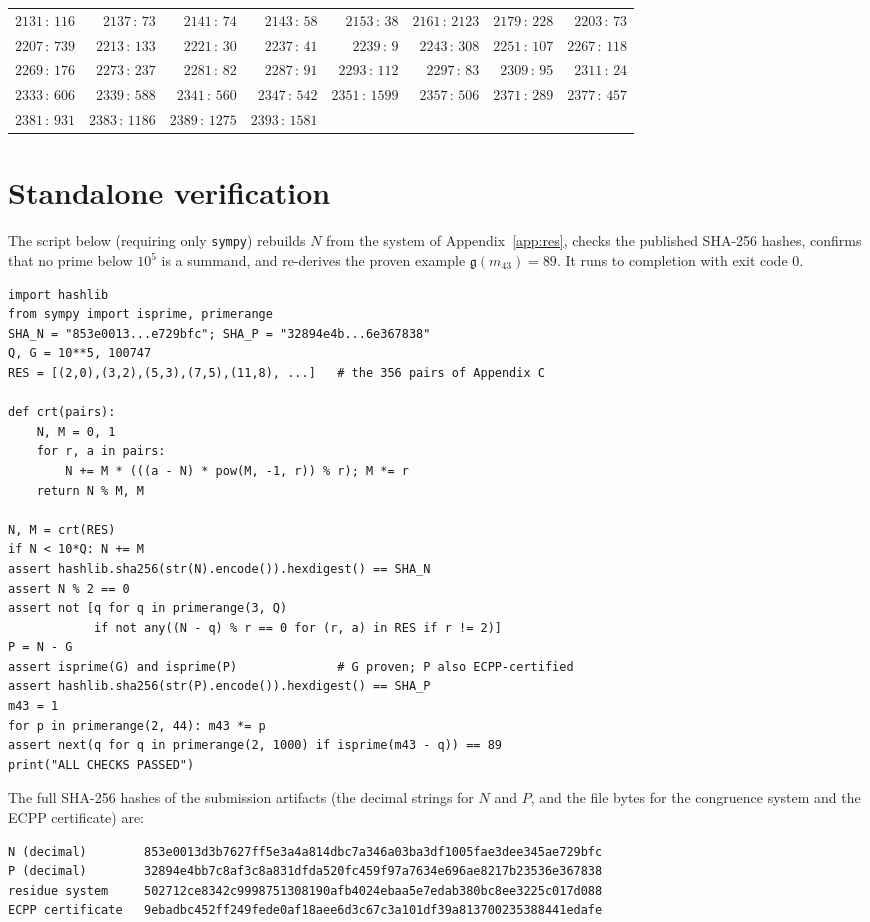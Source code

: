 \documentclass[11pt]{article}
\theoremstyle{plain}
\theoremstyle{definition}
\theoremstyle{remark}
\newcommand{\N}{N}
\newcommand{\g}{\mathfrak{g}}
\begin{document}
\begin{center}
\begin{tabular}{rrrrrrrr}
$2131\,{:}\,116$ & $2137\,{:}\,73$ & $2141\,{:}\,74$ & $2143\,{:}\,58$ & $2153\,{:}\,38$ & $2161\,{:}\,2123$ & $2179\,{:}\,228$ & $2203\,{:}\,73$ \\
$2207\,{:}\,739$ & $2213\,{:}\,133$ & $2221\,{:}\,30$ & $2237\,{:}\,41$ & $2239\,{:}\,9$ & $2243\,{:}\,308$ & $2251\,{:}\,107$ & $2267\,{:}\,118$ \\
$2269\,{:}\,176$ & $2273\,{:}\,237$ & $2281\,{:}\,82$ & $2287\,{:}\,91$ & $2293\,{:}\,112$ & $2297\,{:}\,83$ & $2309\,{:}\,95$ & $2311\,{:}\,24$ \\
$2333\,{:}\,606$ & $2339\,{:}\,588$ & $2341\,{:}\,560$ & $2347\,{:}\,542$ & $2351\,{:}\,1599$ & $2357\,{:}\,506$ & $2371\,{:}\,289$ & $2377\,{:}\,457$ \\
$2381\,{:}\,931$ & $2383\,{:}\,1186$ & $2389\,{:}\,1275$ & $2393\,{:}\,1581$ &  &  &  &  \\
\bottomrule
\end{tabular}
\end{center}

\section{Standalone verification}\label{app:verify}
The script below (requiring only \texttt{sympy}) rebuilds $\N$ from the system of
Appendix~\ref{app:res}, checks the published SHA-256 hashes, confirms that no
prime below $10^{5}$ is a summand, and re-derives the proven example
$\g(m_{43})=89$. It runs to completion with exit code $0$.
\begin{verbatim}
import hashlib
from sympy import isprime, primerange
SHA_N = "853e0013...e729bfc"; SHA_P = "32894e4b...6e367838"
Q, G = 10**5, 100747
RES = [(2,0),(3,2),(5,3),(7,5),(11,8), ...]   # the 356 pairs of Appendix C

def crt(pairs):
    N, M = 0, 1
    for r, a in pairs:
        N += M * (((a - N) * pow(M, -1, r)) % r); M *= r
    return N % M, M

N, M = crt(RES)
if N < 10*Q: N += M
assert hashlib.sha256(str(N).encode()).hexdigest() == SHA_N
assert N % 2 == 0
assert not [q for q in primerange(3, Q)
            if not any((N - q) % r == 0 for (r, a) in RES if r != 2)]
P = N - G
assert isprime(G) and isprime(P)              # G proven; P also ECPP-certified
assert hashlib.sha256(str(P).encode()).hexdigest() == SHA_P
m43 = 1
for p in primerange(2, 44): m43 *= p
assert next(q for q in primerange(2, 1000) if isprime(m43 - q)) == 89
print("ALL CHECKS PASSED")
\end{verbatim}

\noindent The full SHA-256 hashes of the submission artifacts (the decimal
strings for $\N$ and $P$, and the file bytes for the congruence system and the
ECPP certificate) are:
{\small
\begin{verbatim}
N (decimal)        853e0013d3b7627ff5e3a4a814dbc7a346a03ba3df1005fae3dee345ae729bfc
P (decimal)        32894e4bb7c8af3c8a831dfda520fc459f97a7634e696ae8217b23536e367838
residue system     502712ce8342c9998751308190afb4024ebaa5e7edab380bc8ee3225c017d088
ECPP certificate   9ebadbc452ff249fede0af18aee6d3c67c3a101df39a813700235388441edafe
\end{verbatim}}
\end{document}
